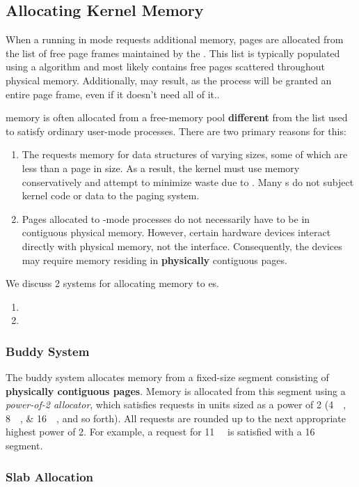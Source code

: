 \subsection{Allocating Kernel Memory}\label{subsec:Allocating_Kernel_Memory}
When a  running in  mode requests additional memory, pages are allocated from the list of free page frames maintained by the .
This list is typically populated using a  algorithm and most likely contains free pages scattered throughout physical memory.
Additionally,  may result, as the process will be granted an entire page frame, even if it doesn't need all of it..

 memory is often allocated from a free-memory pool \textbf{different} from the list used to satisfy ordinary user-mode processes.
There are two primary reasons for this:
\begin{enumerate}[noitemsep]
\item The  requests memory for data structures of varying sizes, some of which are less than a page in size.
  As a result, the kernel must use memory conservatively and attempt to minimize waste due to .
  Many s do not subject kernel code or data to the paging system.
\item Pages allocated to -mode processes do not necessarily have to be in contiguous physical memory.
  However, certain hardware devices interact directly with physical memory, not the  interface.
  Consequently, the devices may require memory residing in \textbf{physically} contiguous pages.
\end{enumerate}

We discuss 2 systems for allocating memory to  es.
\begin{enumerate}[noitemsep]
\item {}
\item {}
\end{enumerate}

\subsubsection{Buddy System}\label{subsubsec:Buddy_System}
The buddy system allocates memory from a fixed-size segment consisting of \textbf{physically contiguous pages}.
Memory is allocated from this segment using a \emph{power-of-2 allocator}, which satisfies requests in units sized as a power of 2 (\SIlist{4;8;16}{\kibi{} \byte{}}, and so forth).
All requests are rounded up to the next appropriate highest power of 2.
For example, a request for \SI{11}{\kibi{} \byte{}} is satisfied with a \SI{16}{\kibi{} \byte{}} segment.

\subsubsection{Slab Allocation}\label{subsubsec:Slab_Allocation}

